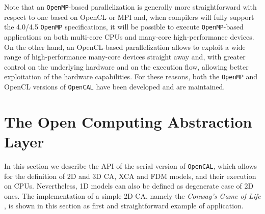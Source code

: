   Note that an \texttt{OpenMP}-based parallelization is generally more
  straightforward with respect to one based on OpenCL or MPI and, when
  compilers will fully support the 4.0/4.5 \texttt{OpenMP} specifications, it
  will be possible to execute \texttt{OpenMP}-based applications on both
  multi-core CPUs and many-core high-performance devices. On the other
  hand, an OpenCL-based parallelization allows to exploit a wide range
  of high-performance many-core devices straight away and, with greater control on the underlying hardware and on the execution flow, allowing better exploitation of the hardware capabilities. 
 For these reasons, both the \texttt{OpenMP} and OpenCL versions of \texttt{OpenCAL} have been developed and are maintained. 
  
\section{The Open Computing Abstraction Layer}
\label{sec:OpenCAL}
In this section we describe the API of the serial version of
\texttt{OpenCAL}, which allows for the definition of 2D and 3D CA, XCA and
FDM models, and their execution on CPUs. Nevertheless, 1D models can
also be defined as degenerate case of 2D ones. The implementation of
a simple 2D CA, namely the \textit{Conway's Game of Life}
\cite{gardner1970a}, is shown in this section as first and
straightforward example of application.

